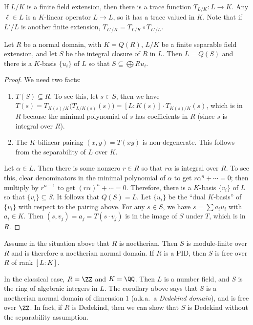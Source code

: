  If $L/K$ is a finite field extension, then there is a trace function $T_{L/K}:L\to K$.
 Any $\ell\in L$ is a $K$-linear operator $L\to L$, so it has a trace valued in $K$. Note
 that if $L'/L$ is another finite extension, $T_{L'/K}= T_{L/K} \circ T_{L'/L}$.
 \begin{theorem}
   Let $R$ be a normal domain, with $K=Q(R)$, $L/K$ be a finite separable field
   extension, and let $S$ be the integral closure of $R$ in $L$. Then $L=Q(S)$ and there
   is a $K$-basis $\{u_i\}$ of $L$ so that $S\subseteq \bigoplus Ru_i$.
 \end{theorem}
 \begin{proof}
   We need two facts:
   \begin{enumerate}
     \item $T(S)\subseteq R$. To see this, let $s\in S$, then we have $T(s)=T_{K(s)/K}
     \bigl( T_{L/K(s)}(s)\bigr) = [L:K(s)] \cdot T_{K(s)/K}(s)$, which is in $R$ because
     the minimal polynomial of $s$ has coefficients in $R$ (since $s$ is integral over
     $R$).

     \item The $K$-bilinear pairing $(x,y) = T(xy)$ is non-degenerate. This follows from
     the separability of $L$ over $K$.
   \end{enumerate}
   Let $\alpha\in L$. Then there is some nonzero $r\in R$ so that $r\alpha$ is
   integral over $R$. To see this, clear denominators in the minimal polynomial of
   $\alpha$ to get $r\alpha^n + \cdots =0$; then multiply by $r^{n-1}$ to get
   $(r\alpha)^n+\cdots = 0$. Therefore, there is a $K$-basis $\{v_i\}$ of $L$ so that
   $\{v_i\}\subseteq S$. It follows that $Q(S)=L$. Let $\{u_i\}$ be the ``dual
   $K$-basis'' of $\{v_i\}$ with respect to the pairing above. For any $s\in S$, we
   have $s = \sum a_i u_i$ with $a_i\in K$. Then $(s,v_j)=a_j = T(s\cdot v_j)$ is in the
   image of $S$ under $T$, which is in $R$.
 \end{proof}
 \begin{corollary}
   Assume in the situation above that $R$ is noetherian. Then $S$ is module-finite over
   $R$ and is therefore a noetherian normal domain. If $R$ is a PID, then $S$ is free
   over $R$ of rank $[L:K]$.
 \end{corollary}
 In the classical case, $R=\ZZ$ and $K=\QQ$. Then $L$ is a number field, and $S$ is the
 ring of algebraic integers in $L$. The corollary above says that $S$ is a noetherian
 normal domain of dimension $1$ (a.k.a.~a \emph{Dedekind domain}), and is free over
 $\ZZ$. In fact, if $R$ is Dedekind, then we can show that $S$ is Dedekind without the
 separability assumption.

